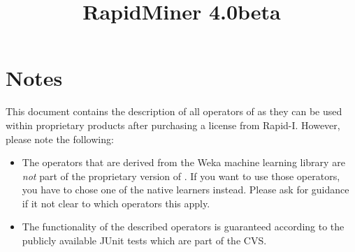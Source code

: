 \documentclass{operatorreference}
\title{
  {\Huge RapidMiner 4.0beta}
}
\begin{document}
\maketitle
\tableofcontents


\chapter{Notes}

This document contains the description of all operators of \rapidminer as
they can be used within proprietary products after purchasing a license from Rapid-I. 
However, please note the following:

\begin{itemize}
\item The operators that are derived from the Weka machine learning
  library are \emph{not} part of the proprietary version of \rapidminer. If
  you want to use those operators, you have to chose one of the native
  \rapidminer learners instead. Please ask for guidance if it not clear to
  which operators this apply.
\item The functionality of the described operators is guaranteed according to
  the publicly available JUnit tests which are part of the \rapidminer CVS.
\end{itemize}




\begin{appendix}



\end{appendix}

% 
%

\printindex
\end{document}
